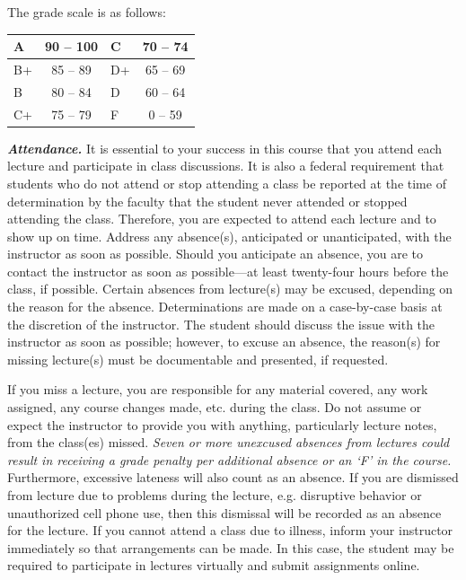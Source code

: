 \documentclass[11pt,letterpaper]{article}
\begin{document}

The grade scale is as follows: \par
        \begin{table}[!ht]
        \centering
        \begin{tabular}{|l||c|l||c|} \hline
        A & 90 -- 100 & C & 70 -- 74 \\ \hline
        B+ & 85 -- 89 & D+ & 65 -- 69 \\ \hline
        B & 80 -- 84 & D & 60 -- 64 \\ \hline
        C+ & 75 -- 79 & F & 0 -- 59 \\ \hline
        \end{tabular}
        \end{table} 
\sectionbreak




{\itshape\bfseries\color{scred}Attendance.} It is essential to your success in this course that you attend each lecture and participate in class discussions. It is also a federal requirement that students who do not attend or stop attending a class be reported at the time of determination by the faculty that the student never attended or stopped attending the class. Therefore, you are expected to attend each lecture and to show up on time. Address any absence(s), anticipated or unanticipated, with the instructor as soon as possible. Should you anticipate an absence, you are to contact the instructor as soon as possible---at least twenty-four hours before the class, if possible. Certain absences from lecture(s) may be excused, depending on the reason for the absence. Determinations are made on a case-by-case basis at the discretion of the instructor. The student should discuss the issue with the instructor as soon as possible; however, to excuse an absence, the reason(s) for missing lecture(s) must be documentable and presented, if requested. \pspace

If you miss a lecture, you are responsible for any material covered, any work assigned, any course changes made, etc. during the class. Do not assume or expect the instructor to provide you with anything, particularly lecture notes, from the class(es) missed. {\itshape Seven or more unexcused absences from lectures could result in receiving a grade penalty per additional absence or an `F' in the course.} Furthermore, excessive lateness will also count as an absence. If you are dismissed from lecture due to problems during the lecture, e.g. disruptive behavior or unauthorized cell phone use, then this dismissal will be recorded as an absence for the lecture. If you cannot attend a class due to illness, inform your instructor immediately so that arrangements can be made. In this case, the student may be required to participate in lectures virtually and submit assignments online. \pspace
\end{document}
